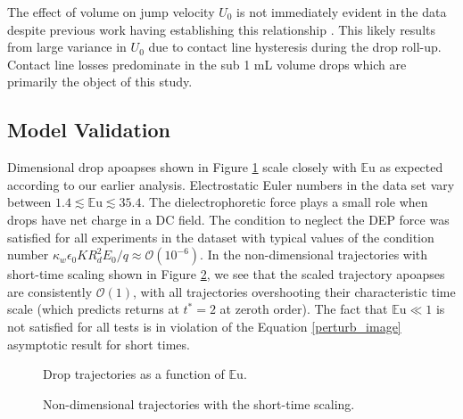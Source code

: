\documentclass[aip,reprint, floatfix]{revtex4-1}
\begin{document}
The effect of volume on jump velocity $U_0$ is not immediately evident in the data despite previous work having establishing this relationship \cite{attari_puddle_2016}. This likely results from large variance in $U_0$ due to contact line hysteresis during the drop roll-up. Contact line losses predominate in the sub 1 mL volume drops which are primarily the object of this study.  

\subsection{Model Validation}
Dimensional drop apoapses shown in Figure \ref{fig:series_s_eu} scale closely with $\mathbb{E}\mbox{u}$ as expected according to our earlier analysis. Electrostatic Euler numbers in the data set vary between $1.4 \lesssim \mathbb{E}\mbox{u} \lesssim 35.4$. The dielectrophoretic force plays a small role when drops have net charge in a DC field. The condition to neglect the DEP force was satisfied for all experiments in the dataset with typical values of the condition number $\kappa_w \epsilon_0 K R_d^2 E_0/q \approx \mathcal{O}(10^{-6})$. In the non-dimensional trajectories with short-time scaling shown in Figure \ref{fig:series_s_ds}, we see that the scaled trajectory apoapses are consistently $\mathcal{O}(1)$, with all trajectories overshooting their characteristic time scale (which predicts returns at $t^*  =2$ at zeroth order). The fact that $\mathbb{E}\mbox{u} \ll 1$ is not satisfied for all tests is in violation of the Equation \ref{perturb_image} asymptotic result for short times.
\begin{figure}[!htb]
    \centering
    \resizebox{0.5\textwidth}{!}{}
    \caption{Drop trajectories as a function of $\mathbb{E}\mbox{u}$.\label{fig:series_s_eu}}
\end{figure}
\begin{figure}[htb]
    \centering
    \resizebox{0.5\textwidth}{!}{}
    \caption{Non-dimensional trajectories with the short-time scaling.\label{fig:series_s_ds}}
\end{figure}
\end{document}
